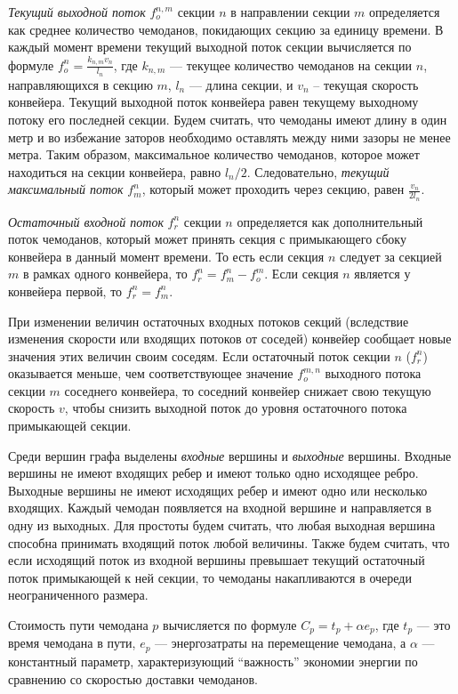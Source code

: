 \documentclass[specification, annotation]{itmo-student-thesis}
\begin{document}
\textit{Текущий выходной поток} $f_o^{n,m}$ секции $n$ в направлении секции
$m$ определяется как среднее количество чемоданов, покидающих секцию за единицу
времени. В каждый момент времени текущий выходной поток секции вычисляется по
формуле $f_o^n = \frac{k_{n,m} v_n}{l_n}$, где $k_{n,m}$ --- текущее количество чемоданов
на секции $n$, направляющихся в секцию $m$, $l_n$ --- длина секции, и $v_n$ --
текущая скорость конвейера. Текущий выходной поток конвейера равен текущему
выходному потоку его последней секции. Будем считать, что чемоданы имеют длину в
один метр и во избежание заторов необходимо оставлять между ними зазоры не менее
метра. Таким образом, максимальное количество чемоданов, которое может
находиться на секции конвейера, равно $l_n/2$. Следовательно, \textit{текущий максимальный поток} $f_m^n$, который может
проходить через секцию, равен $\frac{v_n}{2l_n}$.

\textit{Остаточный входной поток} $f_r^n$ секции $n$ определяется как дополнительный поток
чемоданов, который может принять секция с примыкающего сбоку конвейера в данный момент
времени. То есть если секция $n$ следует за секцией $m$ в рамках одного
конвейера, то $f_r^n = f_m^n - f_o^m$. Если секция $n$ является у конвейера
первой, то $f_r^n = f_m^n$.

При изменении величин остаточных входных потоков секций (вследствие изменения
скорости или входящих потоков от соседей) конвейер сообщает новые значения этих
величин своим соседям. Если остаточный поток секции $n$ ($f_r^n$) оказывается меньше, чем
соответствующее значение $f_o^{m,n}$ выходного потока секции $m$ соседнего конвейера, то
соседний конвейер снижает свою текущую скорость $v$, чтобы снизить выходной
поток до уровня остаточного потока примыкающей секции.

Среди вершин графа выделены \textit{входные} вершины и \textit{выходные}
вершины. Входные вершины не имеют входящих ребер и имеют только одно исходящее
ребро. Выходные вершины не имеют исходящих ребер и имеют одно или несколько
входящих. Каждый чемодан появляется на входной вершине и направляется в одну из
выходных. Для простоты будем считать, что любая выходная вершина способна
принимать входящий поток любой величины. Также будем считать, что если исходящий
поток из входной вершины превышает текущий остаточный поток примыкающей к ней
секции, то чемоданы накапливаются в очереди неограниченного размера.

Стоимость пути чемодана $p$ вычисляется по формуле $C_p = t_p + \alpha e_p$, где
$t_p$ --- это время чемодана в пути, $e_p$ --- энергозатраты на перемещение чемодана,
а $\alpha$ --- константный параметр, характеризующий \enquote{важность} экономии
энергии по сравнению со скоростью доставки чемоданов.
\end{document}

